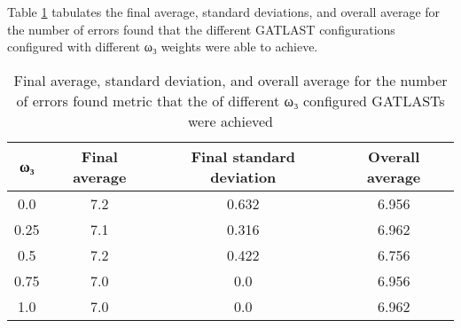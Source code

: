 Table \ref{tab:HP:GA:GWeight:number of errors found} tabulates the final average, standard deviations, and overall average for the number of errors found that the different GATLAST configurations configured with different ω₃ weights were able to achieve.
\begin{table}[tbh!]
\centering
\begin{adjustbox}{trim=0cm 0cm 0cm 0cm, clip=true}
\begin{tabular}{|c|c|c|c|}
\hline
ω₃ & Final average & Final standard deviation & Overall average\\
\hline
0.0 & 7.2 & 0.632 & 6.956\\\hline
0.25 & 7.1 & 0.316 & 6.962\\\hline
0.5 & 7.2 & 0.422 & 6.756\\\hline
0.75 & 7.0 & 0.0 & 6.956\\\hline
1.0 & 7.0 & 0.0 & 6.962\\\hline
\end{tabular}
\end{adjustbox}
\caption{Final average, standard deviation, and overall average for the number of errors found metric that the of different ω₃ configured GATLASTs were achieved}
\label{tab:HP:GA:GWeight:number of errors found}
\end{table}